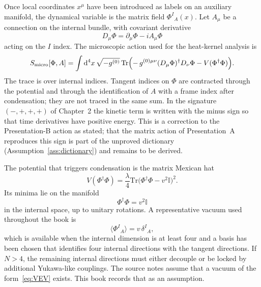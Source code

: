 Once local coordinates \(x^\mu\) have been introduced as labels on an
auxiliary manifold, the dynamical variable is the matrix field
\(\Phi^I{}_A(x)\). Let \(A_\mu\) be a connection on the internal
bundle, with covariant derivative
\begin{equation}
  \label{eq:Dmu-Phi}
  D_\mu\Phi=\partial_\mu\Phi-iA_\mu\Phi
\end{equation}
acting on the \(I\) index. The microscopic action used for the
heat-kernel analysis is
\begin{equation}
  \label{eq:Smicro}
  S_{\mathrm{micro}}[\Phi,A]
  =\int\mathrm{d}^4x\,\sqrt{-g^{(0)}}\,
   \mathrm{Tr}\Bigl(
    -\,g^{(0)\mu\nu}(D_\mu\Phi)^\dagger D_\nu\Phi
     -V(\Phi^\dagger\Phi)
   \Bigr).
\end{equation}
The trace is over internal indices. Tangent indices on \(\Phi\) are
contracted through the potential and through the identification of
\(A\) with a frame index after condensation; they are not traced
in the same sum.
In the signature \((-,+,+,+)\) of Chapter~2 the kinetic term is written with
the minus sign so that time derivatives have positive energy. This is a
correction to the Presentation-B action as stated; that the matrix action
of Presentation~A reproduces this sign is part of the unproved dictionary
(Assumption~\ref{ass:dictionary}) and remains to be derived.

The potential that triggers condensation is the matrix Mexican hat
\begin{equation}
  \label{eq:V}
  V(\Phi^\dagger\Phi)
  =\frac{\lambda}{4}
   \mathrm{Tr}\bigl(\Phi^\dagger\Phi-v^2\mathbb{I}\bigr)^2.
\end{equation}
Its minima lie on the manifold
\begin{equation}
  \label{eq:vacuum-manifold}
  \Phi^\dagger\Phi=v^2\mathbb{I}
\end{equation}
in the internal space, up to unitary rotations. A representative
vacuum used throughout the book is
\begin{equation}
  \label{eq:VEV}
  \langle\Phi^I{}_A\rangle=v\,\delta^I{}_A,
\end{equation}
which is available when the internal dimension is at least four and a
basis has been chosen that identifies four internal directions with
the tangent directions. If \(N>4\), the remaining internal directions
must either decouple or be locked by additional Yukawa-like couplings.
The source notes assume that a vacuum of the form~\eqref{eq:VEV}
exists. This book records that as an assumption.

